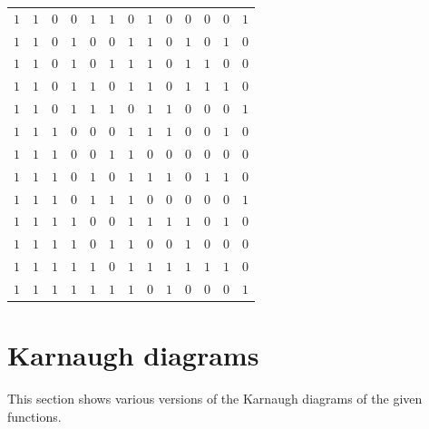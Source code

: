 \documentclass [15pt,a4paper,twoside]{article}
\begin{document}
\begin{center}
\begin{tabular}{cccccc|ccccccc}
$1$&$1$&$0$&$0$&$1$&$1$&$0$&$1$&$0$&$0$&$0$&$0$&$1$\\
$1$&$1$&$0$&$1$&$0$&$0$&$1$&$1$&$0$&$1$&$0$&$1$&$0$\\
$1$&$1$&$0$&$1$&$0$&$1$&$1$&$1$&$0$&$1$&$1$&$0$&$0$\\
$1$&$1$&$0$&$1$&$1$&$0$&$1$&$1$&$0$&$1$&$1$&$1$&$0$\\
$1$&$1$&$0$&$1$&$1$&$1$&$0$&$1$&$1$&$0$&$0$&$0$&$1$\\
$1$&$1$&$1$&$0$&$0$&$0$&$1$&$1$&$1$&$0$&$0$&$1$&$0$\\
$1$&$1$&$1$&$0$&$0$&$1$&$1$&$0$&$0$&$0$&$0$&$0$&$0$\\
$1$&$1$&$1$&$0$&$1$&$0$&$1$&$1$&$1$&$0$&$1$&$1$&$0$\\
$1$&$1$&$1$&$0$&$1$&$1$&$1$&$0$&$0$&$0$&$0$&$0$&$1$\\
$1$&$1$&$1$&$1$&$0$&$0$&$1$&$1$&$1$&$1$&$0$&$1$&$0$\\
$1$&$1$&$1$&$1$&$0$&$1$&$1$&$0$&$0$&$1$&$0$&$0$&$0$\\
$1$&$1$&$1$&$1$&$1$&$0$&$1$&$1$&$1$&$1$&$1$&$1$&$0$\\
$1$&$1$&$1$&$1$&$1$&$1$&$1$&$0$&$1$&$0$&$0$&$0$&$1$\\

\end{tabular}
\end{center}
\section{Karnaugh diagrams}
This section shows various versions of the Karnaugh diagrams of the given functions.
\end{document}
